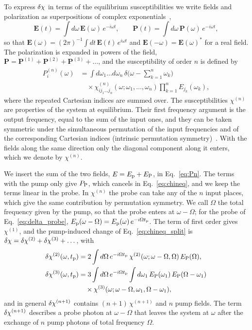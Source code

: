 \documentclass[aps,prb,reprint,superscriptaddress,amsmath,amssymb]{revtex4-2}
\begin{document}
To express $\delta\chi$ in terms of the equilibrium susceptibilities we write fields and polarization as superpositions of
complex exponentials~\cite{Boyd},
\begin{equation*}
\bm{E}(t) = \int d\omega\,\bm{E}(\omega)\,e^{-i\omega t} , \qquad
\bm{P}(t) = \int d\omega\,\bm{P}(\omega)\,e^{-i\omega t} ,
\end{equation*}
so that $\bm{E}(\omega) = (2\pi)^{-1}\int dt\,\bm{E}(t)\,e^{i\omega t}$ and $\bm{E}(-\omega) = \bm{E}(\omega)^*$ for a
real field. The polarization is expanded in powers of the field,
$\bm{P} = \bm{P}^{(1)}+\bm{P}^{(2)}+\bm{P}^{(3)}+\dots$, and the susceptibility of order $n$ is defined by
\begin{align}
P^{(n)}_i(\omega) &= \int d\omega_1\dots d\omega_n\,\delta\Big(\omega-\sum_{k=1}^n\omega_k\Big) \nonumber\\
&\quad\times\chi^{(n)}_{ij_1\dots j_n}(\omega;\omega_1,\dots,\omega_n)\prod_{k=1}^n E_{j_k}(\omega_k) ,
\label{eq:Pn}
\end{align}
where the repeated Cartesian indices are summed over. The susceptibilities $\chi^{(n)}$ are properties of the system
at equilibrium. Their first frequency argument is the output frequency, equal to the sum of the input ones, and they
can be taken symmetric under the simultaneous permutation of the input frequencies and of the corresponding Cartesian
indices (intrinsic permutation symmetry)~\cite{Boyd}. With the fields along the same direction only the diagonal
component along it enters, which we denote by $\chi^{(n)}$.

We insert the sum of the two fields, $E = E_{\mathrm{p}}+E_{\mathrm{P}}$, in Eq.~\eqref{eq:Pn}. The terms with the pump only give
$P_{\mathrm{P}}$, which cancels in Eq.~\eqref{eq:chineq}, and we keep the terms linear in the probe. In $\chi^{(n)}$ the probe
can take any of the $n$ input places, which give the same contribution by permutation symmetry. We call $\Omega$ the
total frequency given by the pump, so that the probe enters at $\omega-\Omega$; for the probe of
Eq.~\eqref{eq:delta_probe}, $E_{\mathrm{p}}(\omega-\Omega) = E_{\mathrm{p}}(\omega)\,e^{-i\Omega t_{\mathrm{p}}}$. The term of first order gives
$\chi^{(1)}$, and the pump-induced change of Eq.~\eqref{eq:chineq_split} is $\delta\chi = \delta\chi^{(2)}+\delta\chi^{(3)}+\dots$, with
\begin{align}
\delta\chi^{(2)}(\omega,t_{\mathrm{p}}) &= 2\int d\Omega\,e^{-i\Omega t_{\mathrm{p}}}\,\chi^{(2)}(\omega;\omega-\Omega,\Omega)\,E_{\mathrm{P}}(\Omega) ,
\label{eq:dchi2}\\
\delta\chi^{(3)}(\omega,t_{\mathrm{p}}) &= 3\int d\Omega\,e^{-i\Omega t_{\mathrm{p}}}\int d\omega_1\,E_{\mathrm{P}}(\omega_1)\,E_{\mathrm{P}}(\Omega-\omega_1)
\nonumber\\
&\quad\times\chi^{(3)}(\omega;\omega-\Omega,\omega_1,\Omega-\omega_1) ,
\label{eq:dchi3}
\end{align}
and in general $\delta\chi^{(n+1)}$ contains $(n+1)\,\chi^{(n+1)}$ and $n$ pump fields. The term $\delta\chi^{(n+1)}$ describes a
probe photon at $\omega-\Omega$ that leaves the system at $\omega$ after the exchange of $n$ pump photons of total
frequency $\Omega$. 
\end{document}
